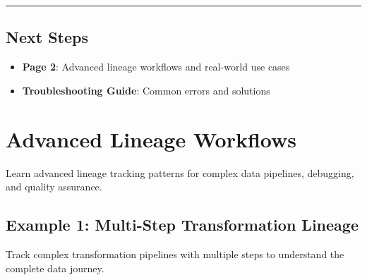 \documentclass[
  letterpaper,
]{scrbook}
\providecommand{\tightlist}{%
  \setlength{\itemsep}{0pt}\setlength{\parskip}{0pt}}
\begin{document}
\begin{center}\rule{0.5\linewidth}{0.5pt}\end{center}

\section{Next Steps}\label{next-steps-19}

\begin{itemize}
\tightlist
\item
  \textbf{Page 2}: Advanced lineage workflows and real-world use cases
\item
  \textbf{Troubleshooting Guide}: Common errors and solutions
\end{itemize}

\chapter{Advanced Lineage Workflows}\label{advanced-lineage-workflows}

Learn advanced lineage tracking patterns for complex data pipelines,
debugging, and quality assurance.

\section{Example 1: Multi-Step Transformation
Lineage}\label{example-1-multi-step-transformation-lineage}

Track complex transformation pipelines with multiple steps to understand
the complete data journey.
\end{document}
